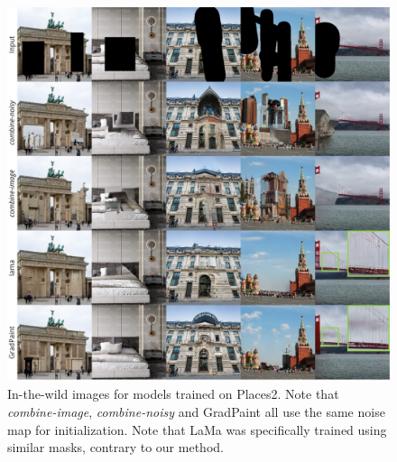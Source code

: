 \begin{figure}[H]
  \centering
    \includegraphics[width=\linewidth]{images/gradpaint/places2.pdf}
    \caption{In-the-wild images for models trained on Places2. Note that \emph{combine-image}, \emph{combine-noisy} and GradPaint all use the same noise map for initialization. Note that LaMa was specifically trained using similar masks, contrary to our method.}
    \label{fig:places}
\end{figure}

